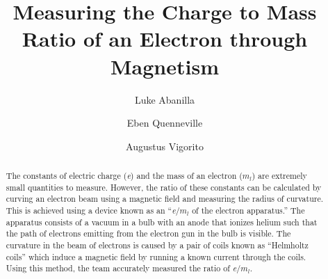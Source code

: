 \documentclass[prX,nofootinbib,notitlepage]{revtex4-1}
\begin{document}





\title{Measuring the Charge to Mass Ratio of an Electron through Magnetism}

\author{Luke Abanilla}%
\author{Eben Quenneville}
\author{Augustus Vigorito}

\begin{abstract}
The constants of electric charge (\textit{e}) and the mass of an electron (\textit{$m_l$}) are extremely small quantities to measure. However, the ratio of these constants can be calculated by curving an electron beam using a magnetic field and measuring the radius of curvature. This is achieved using a device known as an “\textit{e}/\textit{$m_l$} of the electron apparatus.” The apparatus consists of a vacuum in a bulb with an anode that ionizes helium such that the path of electrons emitting from the electron gun in the bulb is visible. The curvature in the beam of electrons is caused by a pair of coils known as “Helmholtz coils” which induce a magnetic field by running a known current through the coils. Using this method, the team accurately measured the ratio of \textit{e}/\textit{$m_l$}.
\end{abstract}

\maketitle

\end{document}
